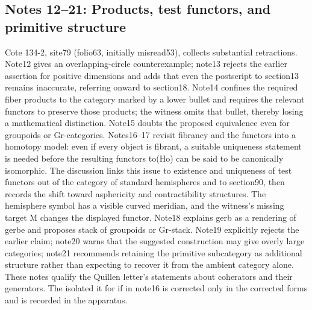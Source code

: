 \documentclass[10pt,oneside]{book}
\begin{document}
\subsection*{Notes 12--21: Products, test functors, and primitive structure}
Cote 134-2, site79 (folio63, initially misread53), collects substantial retractions. Note12 gives an overlapping-circle counterexample; note13 rejects the earlier assertion for positive dimensions and adds that even the postscript to section13 remains inaccurate, referring onward to section18. Note14 confines the required fiber products to the category marked by a lower bullet and requires the relevant functors to preserve those products; the witness omits that bullet, thereby losing a mathematical distinction. Note15 doubts the proposed equivalence even for groupoids or Gr-categories. Notes16--17 revisit fibrancy and the functors into a homotopy model: even if every object is fibrant, a suitable uniqueness statement is needed before the resulting functors to(Ho) can be said to be canonically isomorphic. The discussion links this issue to existence and uniqueness of test functors out of the category of standard hemispheres and to section90, then records the shift toward asphericity and contractibility structures. The hemisphere symbol has a visible curved meridian, and the witness's missing target M changes the displayed functor. Note18 explains gerb as a rendering of gerbe and proposes stack of groupoids or Gr-stack. Note19 explicitly rejects the earlier claim; note20 warns that the suggested construction may give overly large categories; note21 recommends retaining the primitive subcategory as additional structure rather than expecting to recover it from the ambient category alone. These notes qualify the Quillen letter's statements about coherators and their generators. The isolated it for if in note16 is corrected only in the corrected forms and is recorded in the apparatus.
\end{document}
